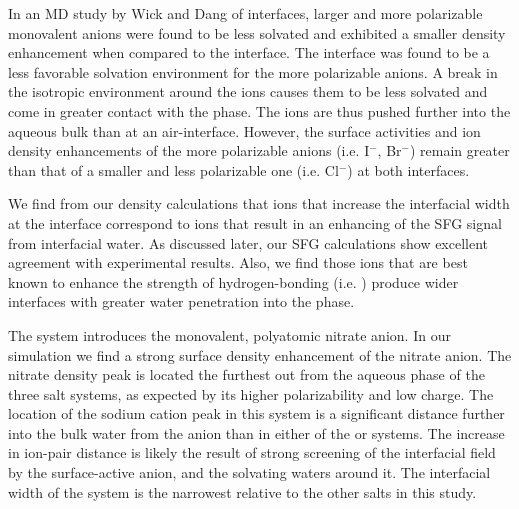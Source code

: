 In an MD study by Wick and Dang\cite{Wick2007a} of \ctcwat interfaces, larger and more polarizable monovalent anions were found to be less solvated and exhibited a smaller density enhancement when compared to the \airwat interface. The \ctcwat interface was found to be a less favorable solvation environment for the more polarizable anions. A break in the isotropic environment around the ions causes them to be less solvated and come in greater contact with the \ctc phase. The ions are thus pushed further into the aqueous bulk than at an air-interface. However, the surface activities and ion density enhancements of the more polarizable anions (i.e. I$^-$, Br$^-$) remain greater than that of a smaller and less polarizable one (i.e. Cl$^-$) at both interfaces. 

We find from our density calculations that ions that increase the interfacial width at the \ctcwat interface correspond to ions that result in an enhancing of the SFG signal from interfacial water. As discussed later, our SFG calculations show excellent agreement with experimental results. Also, we find those ions that are best known to enhance the strength of hydrogen-bonding (i.e. \sul) produce wider interfaces with greater water penetration into the \ctc phase.

The \sodnit system introduces the monovalent, polyatomic nitrate anion. In our simulation we find a strong surface density enhancement of the nitrate anion. The nitrate density peak is located the furthest out from the aqueous phase of the three salt systems, as expected by its higher polarizability and low charge. The location of the sodium cation peak in this system is a significant distance further into the bulk water from the anion than in either of the \nacl or \sodsul systems. The increase in ion-pair distance is likely the result of strong screening of the interfacial field by the surface-active anion, and the solvating waters around it. The interfacial width of the \sodnit system is the narrowest relative to the other salts in this study. 


